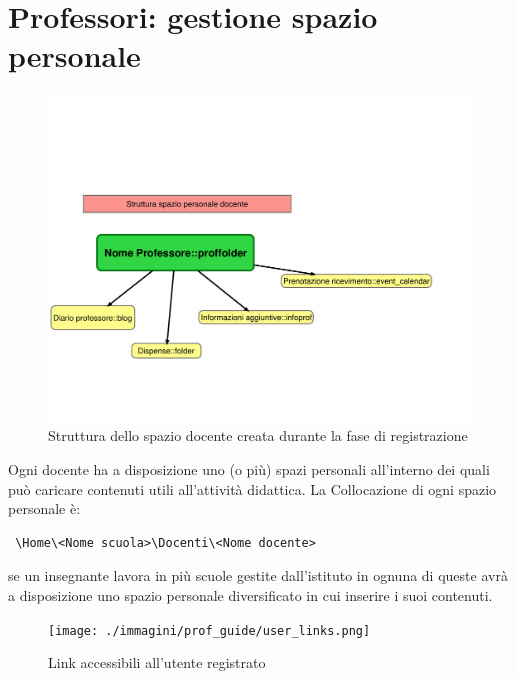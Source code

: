 \chapter[Gestione professori]{Professori: gestione spazio personale}


\begin{figure}[H]
 \centering
 \includegraphics[width=\textwidth]{./immagini/prof_guide/struttura_spazio_docente.pdf}
 \caption{Struttura dello spazio docente creata durante la fase di registrazione}
 \label{fig:proffolder_structture}
\end{figure}



Ogni docente ha a disposizione uno  (o più) spazi personali all'interno dei quali può caricare contenuti utili all'attività didattica. La Collocazione di ogni spazio personale è:
\begin{verbatim}
 \Home\<Nome scuola>\Docenti\<Nome docente>
\end{verbatim}
se un insegnante lavora in più scuole gestite dall'istituto in ognuna di queste avrà a disposizione uno spazio personale diversificato in cui inserire i suoi contenuti.

\begin{figure}[H]
 \centering
 \texttt{[image: ./immagini/prof\_guide/user\_links.png]}
 \caption{Link accessibili all'utente registrato}
 \label{fig:user_links}
\end{figure}

